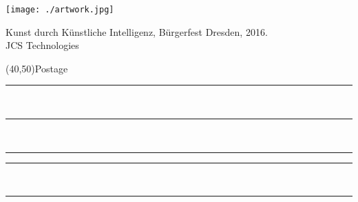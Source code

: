 \documentclass[a6paper,landscape,7pt]{scrartcl}
\begin{document}
\begin{center}
	\texttt{[image: ./artwork.jpg]}
\end{center}


\begin{multicols}{2}
    Kunst durch Künstliche Intelligenz, Bürgerfest Dresden, 2016.\\
    {\small JCS Technologies}
    \columnbreak\par
    \hfill\framebox(40,50){\scriptsize Postage}\par
    \vspace{0.25\textheight}
    \rule{5.8cm}{0.01cm}\vspace*{1cm}\\ %
    \rule{5.8cm}{0.01cm}\vspace*{1cm}\\ %
    \rule{2.2cm}{0.01cm}\hspace*{0.2cm}\rule{3.4cm}{0.01cm}\vspace*{1cm}\\ %
    \rule{5.8cm}{0.01cm}\\ %
\end{multicols} 
\end{document}

